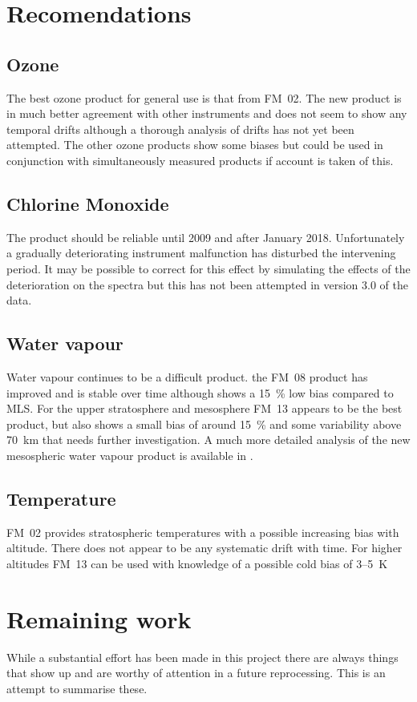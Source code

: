 \section{Recomendations}
\subsection{Ozone}
The best ozone product for general use is that from FM~02.  The new product is
in much better agreement with other instruments and does not seem to show any
temporal drifts although a thorough analysis of drifts has not yet been
attempted.  The other ozone products show some biases but could be used in
conjunction with simultaneously measured products if account is taken of this.

\subsection{Chlorine Monoxide}
The  product should be reliable until 2009 and after January 2018.
Unfortunately a gradually deteriorating instrument malfunction has disturbed
the intervening period.  It may be possible to correct for this effect by simulating the effects of the deterioration on the spectra but this has not been attempted in version 3.0 of the data.

\subsection{Water vapour}
Water vapour continues to be a difficult product. the FM~08 product has
improved and is stable over time although shows a 15~\% low bias compared to
MLS.  For the upper stratosphere and mesosphere FM~13 appears to be the best
product, but also shows a small bias of around 15~\% and some variability above
70~km that needs further investigation.  A much more detailed analysis of the new mesospheric water vapour product is available in \cite{grieco2020}.

\subsection{Temperature}
FM~02 provides stratospheric temperatures with a possible increasing bias with
altitude. There does not appear to be any systematic drift with time. For
higher altitudes FM~13 can be used with knowledge of a possible cold bias of
3--5~K

\section{Remaining work}
While a substantial effort has been made in this project there are always things that show up and are worthy of attention in a future reprocessing. This is an attempt to summarise these.

